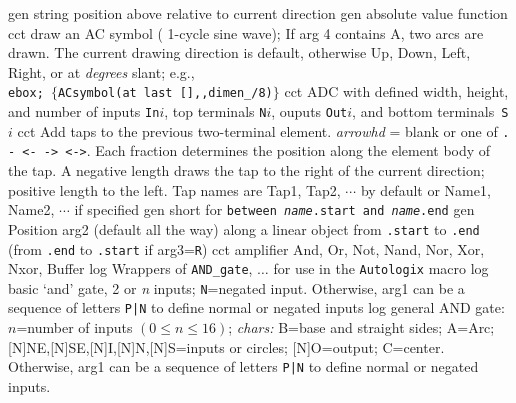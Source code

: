 %
  {gen}
  {string position above relative to current direction}
  {gen}
  {absolute value function}
  {cct}
  {draw an AC symbol ( 1-cycle sine wave); If arg 4 contains A, two arcs
   are drawn.  The current drawing direction is default, otherwise Up, Down,
   Left, Right, or at {\sl degrees} slant;  e.g.,\\ 
   {\tt ebox; $\lbrace$ACsymbol(at last [],{,}dimen\_/8)$\rbrace$}}
  {cct}
  {ADC with defined width, height, and number of inputs {\tt In$i$},
    top terminals {\tt N$i$}, ouputs {\tt Out$i$},
    and bottom terminals~{\tt S$i$}}
  {cct}
  {Add taps to the previous two-terminal element.
   {\sl arrowhd} = blank or one of {\tt . - <- -> <->}.
   Each fraction determines the position along the element body of the tap.
   A negative length draws the tap to the right of the current
   direction; positive length to the left.
   Tap names are Tap1, Tap2, $\cdots$ by default  or
   Name1, Name2, $\cdots$ if specified 
   }
  {gen}
  {short for {\tt between {\sl name}.start and {\sl name}.end}}
  {gen}
  {Position arg2 (default all the way) along a linear object
   from {\tt .start} to {\tt .end}
   (from {\tt .end} to {\tt .start} if arg3={\tt R}) }
  {cct}
  {amplifier}
%
 {And, Or, Not, Nand, Nor, Xor, Nxor, Buffer}{}
  {log}
  {Wrappers of {\tt AND\_gate}, $\ldots$ for use in the {\tt Autologix}
   macro}
  {log}
  {basic `and' gate, 2 or {\sl n\/} inputs; {\tt N}=negated input.
   Otherwise, arg1 can be a sequence of letters {\tt P|N}
   to define normal or negated inputs
    }
  {log}
  {general AND gate: $n$=number of inputs $(0\leq n\leq 16)$;
           {\sl chars:}
           B=base and straight sides; A=Arc;
           [N]NE,[N]SE,[N]I,[N]N,[N]S=inputs or circles;
           [N]O=output; C=center.
   Otherwise, arg1 can be a sequence of letters {\tt P|N}
   to define normal or negated inputs.}
